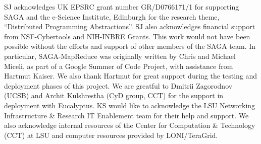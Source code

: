 \documentclass[conference,final]{IEEEtran}
\newcommand{\sagamapreduce }{SAGA-MapReduce }
\begin{document}
SJ acknowledges UK EPSRC grant number GR/D0766171/1 for supporting
SAGA and the e-Science Institute, Edinburgh for the research theme,
``Distributed Programming Abstractions''.  SJ also acknowledges
financial support from NSF-Cybertools and NIH-INBRE Grants. This work
would not have been possible without the efforts and support of other
members of the SAGA team.  In particular, \sagamapreduce was
originally written by Chris and Michael Miceli, as part of a Google
Summer of Code Project, with assistance from Hartmut Kaiser. We also
thank Hartmut for great support during the testing and deployment
phases of this project. We are greatful to Dmitrii Zagorodnov (UCSB)
and Archit Kulshrestha (CyD group, CCT) for the support in deployment
with Eucalyptus.  KS would like to acknowledge the LSU
Networking Infrastructure \& Research IT Enablement team for their help
and support.  We also acknowledge internal resources of the Center for
Computation \& Technology (CCT) at LSU and computer resources provided
by LONI/TeraGrid.  

\end{document}
